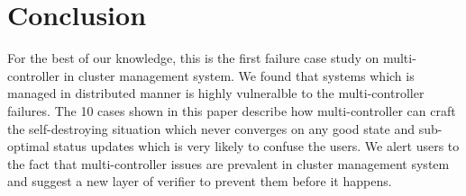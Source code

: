 \section{Conclusion}

For the best of our knowledge, this is the first failure case study on multi-controller in cluster management system. We found that systems which is managed in distributed manner is highly vulneralble to the multi-controller failures. The 10 cases shown in this paper describe how multi-controller can craft the self-destroying situation which never converges on any good state and sub-optimal status updates which is very likely to confuse the users. We alert users to the fact that multi-controller issues are prevalent in cluster management system and suggest a new layer of verifier to prevent them before it happens.
